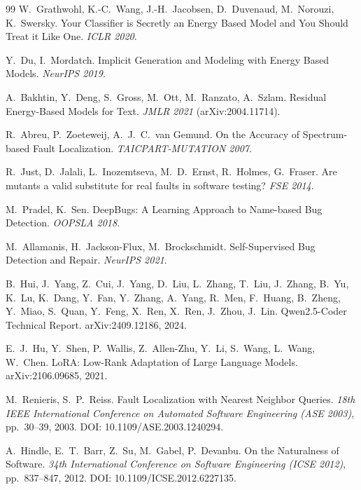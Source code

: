 \documentclass[10pt]{article}
\begin{document}
\begin{thebibliography}{99}
W.~Grathwohl, K.-C.~Wang, J.-H.~Jacobsen, D.~Duvenaud, M.~Norouzi, K.~Swersky.
\newblock Your Classifier is Secretly an Energy Based Model and You Should
Treat it Like One.
\newblock \emph{ICLR 2020}.

Y.~Du, I.~Mordatch.
\newblock Implicit Generation and Modeling with Energy Based Models.
\newblock \emph{NeurIPS 2019}.

A.~Bakhtin, Y.~Deng, S.~Gross, M.~Ott, M.~Ranzato, A.~Szlam.
\newblock Residual Energy-Based Models for Text.
\newblock \emph{JMLR 2021} (arXiv:2004.11714).

R.~Abreu, P.~Zoeteweij, A.~J.~C.~van Gemund.
\newblock On the Accuracy of Spectrum-based Fault Localization.
\newblock \emph{TAICPART-MUTATION 2007}.

R.~Just, D.~Jalali, L.~Inozemtseva, M.~D.~Ernst, R.~Holmes, G.~Fraser.
\newblock Are mutants a valid substitute for real faults in software
testing?
\newblock \emph{FSE 2014}.

M.~Pradel, K.~Sen.
\newblock DeepBugs: A Learning Approach to Name-based Bug Detection.
\newblock \emph{OOPSLA 2018}.

M.~Allamanis, H.~Jackson-Flux, M.~Brockschmidt.
\newblock Self-Supervised Bug Detection and Repair.
\newblock \emph{NeurIPS 2021}.

B.~Hui, J.~Yang, Z.~Cui, J.~Yang, D.~Liu, L.~Zhang, T.~Liu, J.~Zhang,
B.~Yu, K.~Lu, K.~Dang, Y.~Fan, Y.~Zhang, A.~Yang, R.~Men, F.~Huang,
B.~Zheng, Y.~Miao, S.~Quan, Y.~Feng, X.~Ren, X.~Ren, J.~Zhou, J.~Lin.
\newblock Qwen2.5-Coder Technical Report.
\newblock arXiv:2409.12186, 2024.

E.~J.~Hu, Y.~Shen, P.~Wallis, Z.~Allen-Zhu, Y.~Li, S.~Wang, L.~Wang,
W.~Chen.
\newblock LoRA: Low-Rank Adaptation of Large Language Models.
\newblock arXiv:2106.09685, 2021.

M.~Renieris, S.~P.~Reiss.
\newblock Fault Localization with Nearest Neighbor Queries.
\newblock \emph{18th IEEE International Conference on Automated Software
Engineering (ASE 2003)}, pp.~30--39, 2003.
\newblock DOI: 10.1109/ASE.2003.1240294.

A.~Hindle, E.~T.~Barr, Z.~Su, M.~Gabel, P.~Devanbu.
\newblock On the Naturalness of Software.
\newblock \emph{34th International Conference on Software Engineering
(ICSE 2012)}, pp.~837--847, 2012.
\newblock DOI: 10.1109/ICSE.2012.6227135.


\end{thebibliography}
\end{document}
